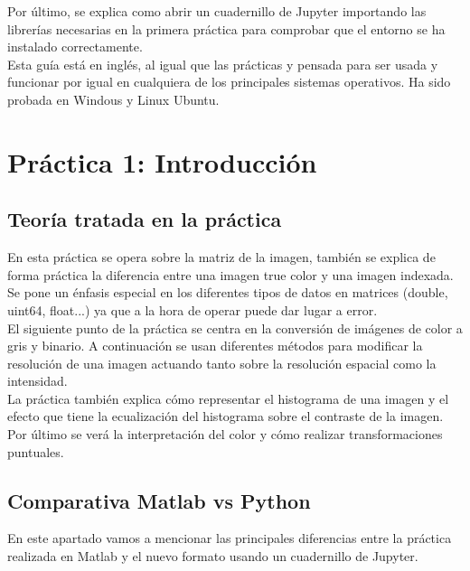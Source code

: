 \documentclass[a4paper,12pt]{report}
\begin{document}
Por último, se explica como abrir un cuadernillo de Jupyter importando las librerías necesarias en la primera práctica para comprobar que el entorno se ha instalado correctamente.\\

Esta guía está en inglés, al igual que las prácticas y pensada para ser usada y funcionar por igual en cualquiera de los principales sistemas operativos. Ha sido probada en Windous y Linux Ubuntu.\\

\section{ Práctica 1: Introducción}

\subsection{Teoría tratada en la práctica}

En esta práctica se opera sobre la matriz de la imagen, también se explica de forma práctica la diferencia entre una imagen true color y una imagen indexada. Se pone un énfasis especial en los diferentes tipos de datos en matrices (double, uint64, float...) ya que a la hora de operar puede dar lugar a error.\\

El siguiente punto de la práctica se centra en la conversión de imágenes de color a gris y binario. A continuación se usan diferentes métodos para modificar la resolución de una imagen actuando tanto sobre la resolución espacial como la intensidad.\\

La práctica también explica cómo representar el histograma de una imagen y el efecto que tiene la ecualización del histograma sobre el contraste de la imagen.\\

Por último se verá la interpretación del color y cómo realizar transformaciones puntuales.\\

\subsection{Comparativa Matlab vs Python}

En este apartado vamos a mencionar las principales diferencias entre la práctica realizada en Matlab y el nuevo formato usando un cuadernillo de Jupyter.\\
\end{document}
